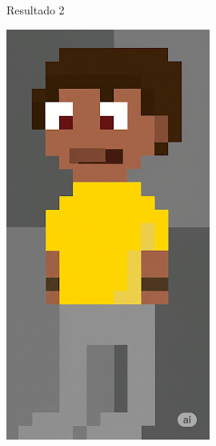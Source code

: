\begin{figure}[htbp]
\begin{subfigure}{0.23\linewidth}
        \caption{\small Resultado 2}
        \label{fig:geminiPro15b}
    \end{subfigure}
    \begin{subfigure}{0.23\linewidth}
        \includegraphics[width=1\linewidth]{figs/geminiPro/chat11/1res3.PNG}

\end{subfigure}
\end{figure}
